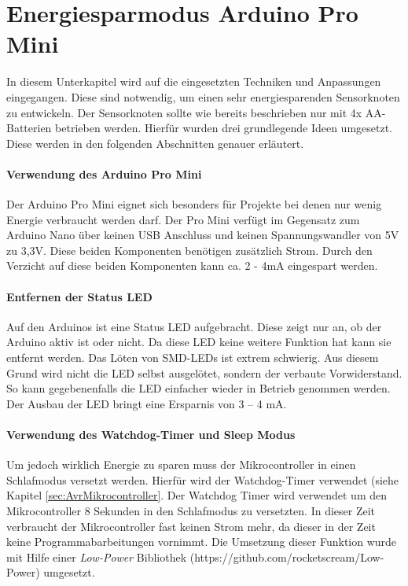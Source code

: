 \section{Energiesparmodus Arduino Pro Mini}
\label{sec:Energiesparmodus}
In diesem Unterkapitel wird auf die eingesetzten Techniken und Anpassungen eingegangen. Diese sind notwendig, um einen sehr energiesparenden Sensorknoten zu entwickeln. Der Sensorknoten sollte wie bereits beschrieben nur mit 4x AA-Batterien betrieben werden. Hierfür wurden drei grundlegende Ideen umgesetzt. Diese werden in den folgenden Abschnitten genauer erläutert. 
\paragraph{Verwendung des Arduino Pro Mini} Der Arduino Pro Mini eignet sich besonders für Projekte bei denen nur wenig Energie verbraucht werden darf. Der Pro Mini verfügt im Gegensatz zum Arduino Nano über keinen USB Anschluss und keinen Spannungswandler von 5V zu 3,3V. Diese beiden Komponenten benötigen zusätzlich Strom. Durch den Verzicht auf diese beiden Komponenten kann ca. 2 - 4mA eingespart werden.
\paragraph{Entfernen der Status LED} Auf den Arduinos ist eine Status LED aufgebracht. Diese zeigt nur an, ob der Arduino aktiv ist oder nicht. Da diese LED keine weitere Funktion hat kann sie entfernt werden. Das Löten von SMD-LEDs ist extrem schwierig. Aus diesem Grund wird nicht die LED selbst ausgelötet, sondern der verbaute Vorwiderstand. So kann gegebenenfalls die LED einfacher wieder in Betrieb genommen werden. Der Ausbau der LED bringt eine Ersparnis von 3 – 4 mA.
\paragraph{Verwendung des  Watchdog-Timer und Sleep Modus} Um jedoch wirklich Energie zu sparen muss der Mikrocontroller in einen Schlafmodus versetzt werden. Hierfür wird der Watchdog-Timer verwendet (siehe Kapitel \ref{sec:AvrMikrocontroller}. Der Watchdog Timer wird verwendet um den Mikrocontroller 8 Sekunden in den Schlafmodus zu versetzten. In dieser Zeit verbraucht der Mikrocontroller fast keinen Strom mehr, da dieser in der Zeit keine Programmabarbeitungen vornimmt. Die Umsetzung dieser Funktion wurde mit Hilfe einer \textit{Low-Power} Bibliothek (https://github.com/rocketscream/Low-Power) umgesetzt.
